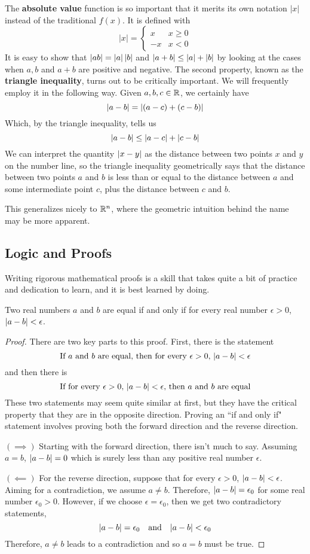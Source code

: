 \begin{example}
    The \textbf{absolute value} function is so important that it merits its own notation $|x|$ instead of the traditional $f(x)$. It is defined with
    \[ |x| = \begin{cases}
        x & x \geq  0 \\
        -x & x < 0
    \end{cases}\]
    It is easy to show that $\abs{ab} = \abs{a}\, \abs{b}$ and $\abs{a+b} \leq \abs{a} + \abs{b}$ by looking at the cases when $a,b$ and $a+b$ are positive and negative. The second property, known as the \textbf{triangle inequality}, turns out to be critically important. We will frequently employ it in the following way. Given $a,b,c\in\mathbb{R}$, we certainly have
    \[ \abs{a-b} = \abs{(a-c) + (c-b)} \]
    Which, by the triangle inequality, tells us
    \[ \abs{a-b} \leq \abs{a-c} + \abs{c-b} \]
    We can interpret the quantity $\abs{x-y}$ as the distance between two points $x$ and $y$ on the number line, so the triangle inequality geometrically says that the distance between two points $a$ and $b$ is less than or equal to the distance between $a$ and some intermediate point $c$, plus the distance between $c$ and $b$. 

    This generalizes nicely to $\mathbb{R}^n$, where the geometric intuition behind the name may be more apparent.
\end{example}
\subsection*{Logic and Proofs}
Writing rigorous mathematical proofs is a skill that takes quite a bit of practice and dedication to learn, and it is best learned by doing. 
\begin{theorem}
    Two real numbers $a$ and $b$ are equal if and only if for every real number $\epsilon > 0$, $\abs{a-b} < \epsilon$. 
\end{theorem}
\begin{proof}
    There are two key parts to this proof. First, there is the statement
    \[ \text{If $a$ and $b$ are equal, then for every $\epsilon > 0$, $\abs{a-b}<\epsilon$} \]
    and then there is
    \[ \text{If for every $\epsilon > 0$, $\abs{a-b}< \epsilon$, then $a$ and $b$ are equal} \]
    These two statements may seem quite similar at first, but they have the critical property that they are in the opposite direction. Proving an ``if and only if" statement involves proving both the forward direction and the reverse direction. 

    $(\implies)$ Starting with the forward direction, there isn't much to say. Assuming $a=b$, $\abs{a-b} = 0$ which is surely less than any positive real number $\epsilon$. 

    $(\impliedby)$ For the reverse direction, suppose that for every $\epsilon > 0$, $\abs{a-b}< \epsilon$. Aiming for a contradiction, we assume $a\neq b$. Therefore, $\abs{a-b} = \epsilon_0$ for some real number $\epsilon_0>0$. However, if we choose $\epsilon = \epsilon_0$, then we get two contradictory statements,
    \[ \abs{a-b} = \epsilon_0 \quad\text{and}\quad \abs{a-b} < \epsilon_0\]
    Therefore, $a\neq b$ leads to a contradiction and so $a=b$ must be true. 
\end{proof}
